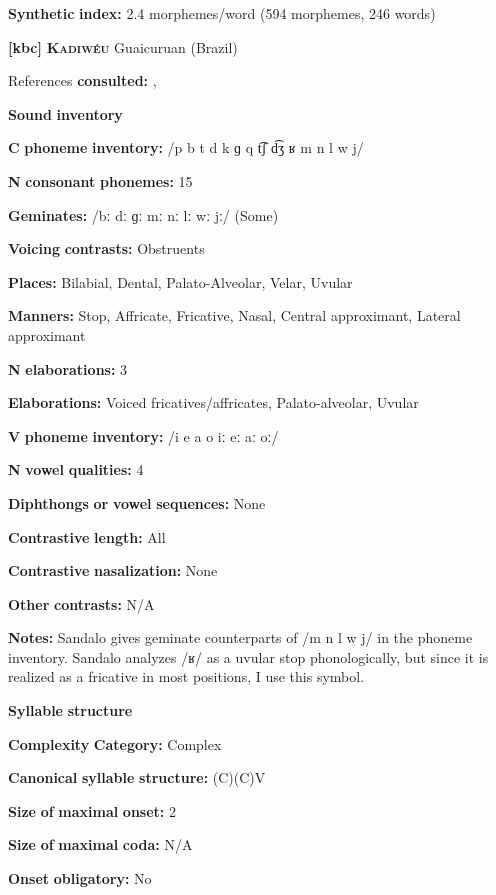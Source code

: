 \begin{styleBody}
\textbf{Synthetic} \textbf{index:} 2.4 morphemes/word (594 morphemes, 246 words)

\textbf{[kbc]}   \textbf{\textsc{Kadiwéu}}  Guaicuruan (Brazil)

References \textbf{consulted:} \citet{Braggio1981}, \citet{Sandalo1997}

\textbf{Sound} \textbf{inventory}

\textbf{C} \textbf{phoneme} \textbf{inventory:} /p b t d k ɡ q t͡ʃ d͡ʒ ʁ m n l w j/

\textbf{N} \textbf{consonant} \textbf{phonemes:} 15

\textbf{Geminates:} /bː dː ɡː mː nː lː wː jː/ (Some)

\textbf{Voicing} \textbf{contrasts:} Obstruents

\textbf{Places:} Bilabial, Dental, Palato-Alveolar, Velar, Uvular

\textbf{Manners:} Stop, Affricate, Fricative, Nasal, Central approximant, Lateral approximant

\textbf{N} \textbf{elaborations:} 3

\textbf{Elaborations:} Voiced fricatives/affricates, Palato-alveolar, Uvular

\textbf{V} \textbf{phoneme} \textbf{inventory:} /i e a o iː eː aː oː/

\textbf{N} \textbf{vowel} \textbf{qualities:} 4

\textbf{Diphthongs} \textbf{or} \textbf{vowel} \textbf{sequences:} None

\textbf{Contrastive} \textbf{length:} All

\textbf{Contrastive} \textbf{nasalization:} None

\textbf{Other} \textbf{contrasts:} N/A

\textbf{Notes:} Sandalo gives geminate counterparts of /m n l w j/ in the phoneme inventory. Sandalo analyzes /ʁ/ as a uvular stop phonologically, but since it is realized as a fricative in most positions, I use this symbol.

\textbf{Syllable} \textbf{structure}

\textbf{Complexity} \textbf{Category:} Complex

\textbf{Canonical} \textbf{syllable} \textbf{structure:} (C)(C)V \citep[17-18]{Sandalo1997}

\textbf{Size} \textbf{of} \textbf{maximal} \textbf{onset:} 2

\textbf{Size} \textbf{of} \textbf{maximal} \textbf{coda:} N/A

\textbf{Onset} \textbf{obligatory:} No


\end{styleBody}
